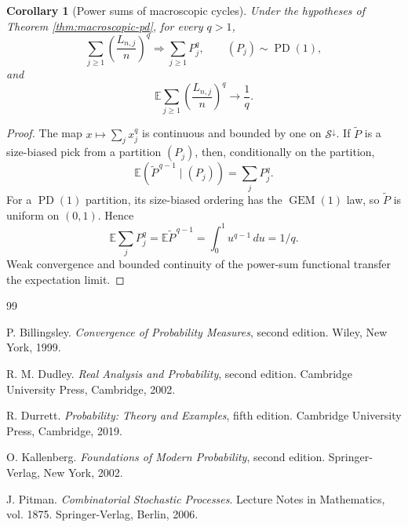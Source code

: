 \documentclass[11pt]{article}
\newtheorem{corollary}[theorem]{Corollary}
\theoremstyle{remark}
\newcommand{\Ee}{\mathbb E}
\newcommand{\dd}{\,d}
\begin{document}
\begin{corollary}[Power sums of macroscopic cycles]
\label{cor:pd-power-sums}
Under the hypotheses of Theorem \ref{thm:macroscopic-pd}, for every $q>1$,
\[
 \sum_{j\ge1}\left(\frac{L_{n,j}}n\right)^q
 \Rightarrow\sum_{j\ge1}P_j^q,
 \qquad (P_j)\sim\operatorname{PD}(1),
\]
and
\[
 \Ee\sum_{j\ge1}\left(\frac{L_{n,j}}n\right)^q
 \longrightarrow\frac1q.
\]
\end{corollary}

\begin{proof}
The map $x\mapsto\sum_jx_j^q$ is continuous and bounded by one on
$\mathcal S^\downarrow$.  If $\widetilde P$ is a size-biased pick from a
partition $(P_j)$, then, conditionally on the partition,
\[
        \Ee(\widetilde P^{\,q-1}\mid(P_j))=\sum_jP_j^q.
\]
For a $\operatorname{PD}(1)$ partition, its size-biased ordering has the
$\operatorname{GEM}(1)$ law, so $\widetilde P$ is uniform on $(0,1)$.  Hence
\[
        \Ee\sum_jP_j^q
        =\Ee\widetilde P^{\,q-1}
        =\int_0^1u^{q-1}\dd u=1/q.
\]
Weak convergence and bounded continuity of the power-sum functional transfer
the expectation limit.
\end{proof}

\begin{thebibliography}{99}

P. Billingsley.
\newblock \emph{Convergence of Probability Measures}, second edition.
\newblock Wiley, New York, 1999.

R. M. Dudley.
\newblock \emph{Real Analysis and Probability}, second edition.
\newblock Cambridge University Press, Cambridge, 2002.

R. Durrett.
\newblock \emph{Probability: Theory and Examples}, fifth edition.
\newblock Cambridge University Press, Cambridge, 2019.

O. Kallenberg.
\newblock \emph{Foundations of Modern Probability}, second edition.
\newblock Springer-Verlag, New York, 2002.

J. Pitman.
\newblock \emph{Combinatorial Stochastic Processes}.
\newblock Lecture Notes in Mathematics, vol. 1875.
\newblock Springer-Verlag, Berlin, 2006.

\end{thebibliography}
\end{document}
